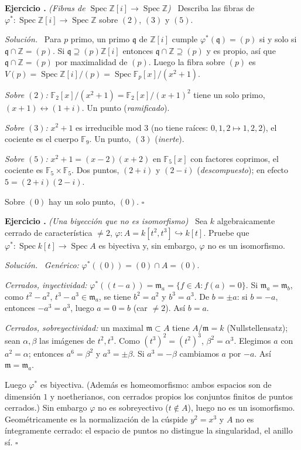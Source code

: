 \documentclass[11pt,a4paper]{article}
\newcommand{\Spec}{\operatorname{Spec}}
\newcommand{\ZZ}{\mathbb{Z}}
\newcommand{\FF}{\mathbb{F}}
\newcommand{\q}{\mathfrak{q}}
\newcommand{\m}{\mathfrak{m}}
\newcounter{ej}
\newenvironment{ejercicio}[1]{\refstepcounter{ej}\par\bigskip\noindent\textbf{Ejercicio \theej.} \emph{(#1)}\ }{\par}
\newenvironment{solucion}{\par\smallskip\noindent\textit{Solución.}\ }{\hfill$\square$\par}
\begin{document}
\begin{ejercicio}{Fibras de $\Spec\ZZ[i]\to\Spec\ZZ$}
Describa las fibras de $\varphi^*:\Spec\ZZ[i]\to\Spec\ZZ$ sobre $(2)$, $(3)$ y $(5)$.
\end{ejercicio}
\begin{solucion}
Para $p$ primo, un primo $\q$ de $\ZZ[i]$ cumple $\varphi^*(\q)=(p)$ si y solo si $\q\cap\ZZ=(p)$. Si $\q\supseteq(p)\ZZ[i]$ entonces $\q\cap\ZZ\supseteq(p)$ y es propio, así que $\q\cap\ZZ=(p)$ por maximalidad de $(p)$. Luego la fibra sobre $(p)$ es $V(p)=\Spec\ZZ[i]/(p)=\Spec\FF_p[x]/(x^2+1)$.

\emph{Sobre $(2)$:} $\FF_2[x]/(x^2+1)=\FF_2[x]/(x+1)^2$ tiene un solo primo, $(x+1)\leftrightarrow(1+i)$. Un punto (\emph{ramificado}).

\emph{Sobre $(3)$:} $x^2+1$ es irreducible mod $3$ (no tiene raíces: $0,1,2\mapsto1,2,2$), el cociente es el cuerpo $\FF_9$. Un punto, $(3)$ (\emph{inerte}).

\emph{Sobre $(5)$:} $x^2+1=(x-2)(x+2)$ en $\FF_5[x]$ con factores coprimos, el cociente es $\FF_5\times\FF_5$. Dos puntos, $(2+i)$ y $(2-i)$ (\emph{descompuesto}); en efecto $5=(2+i)(2-i)$.

Sobre $(0)$ hay un solo punto, $(0)$.
\end{solucion}

\begin{ejercicio}{Una biyección que no es isomorfismo}
Sea $k$ algebraicamente cerrado de característica $\ne2$, $\varphi:A=k[t^2,t^3]\hookrightarrow k[t]$. Pruebe que $\varphi^*:\Spec k[t]\to\Spec A$ es biyectiva y, sin embargo, $\varphi$ no es un isomorfismo.
\end{ejercicio}
\begin{solucion}
\emph{Genérico:} $\varphi^*((0))=(0)\cap A=(0)$.

\emph{Cerrados, inyectividad:} $\varphi^*((t-a))=\m_a=\{f\in A:f(a)=0\}$. Si $\m_a=\m_b$, como $t^2-a^2,\,t^3-a^3\in\m_a$, se tiene $b^2=a^2$ y $b^3=a^3$. De $b=\pm a$: si $b=-a$, entonces $-a^3=a^3$, luego $a=0=b$ (car $\ne2$). Así $b=a$.

\emph{Cerrados, sobreyectividad:} un maximal $\m\subset A$ tiene $A/\m=k$ (Nullstellensatz); sean $\alpha,\beta$ las imágenes de $t^2,t^3$. Como $(t^3)^2=(t^2)^3$, $\beta^2=\alpha^3$. Elegimos $a$ con $a^2=\alpha$; entonces $a^6=\beta^2$ y $a^3=\pm\beta$. Si $a^3=-\beta$ cambiamos $a$ por $-a$. Así $\m=\m_a$.

Luego $\varphi^*$ es biyectiva. (Además es homeomorfismo: ambos espacios son de dimensión $1$ y noetherianos, con cerrados propios los conjuntos finitos de puntos cerrados.) Sin embargo $\varphi$ no es sobreyectivo ($t\notin A$), luego no es un isomorfismo. Geométricamente es la normalización de la cúspide $y^2=x^3$ y $A$ no es íntegramente cerrado: el espacio de puntos no distingue la singularidad, el anillo sí.
\end{solucion}
\end{document}
